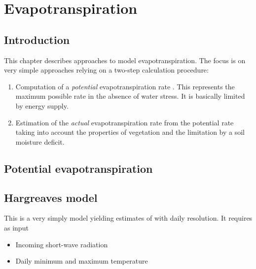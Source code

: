 \chapter{Evapotranspiration} \label{chap:et}
\renewcommand{\tabdir}{chapters/part_processes/evapotranspiration/tab}
\renewcommand{\figdir}{chapters/part_processes/evapotranspiration/fig}

\section{Introduction} \label{sec:et_intro}

This chapter describes approaches to model evapotranspiration. The focus is on very simple approaches relying on a two-step calculation procedure:
\begin{enumerate}
  \item Computation of a \emph{potential} evapotranspiration rate \etPot. This represents the maximum possible rate in the absence of water stress. It is basically limited by energy supply.
  \item Estimation of the \emph{actual} evapotranspiration rate \etReal{} from the potential rate taking into account the properties of vegetation and the limitation by a soil moisture deficit.
\end{enumerate}


\section{Potential evapotranspiration} \label{sec:et:pot}

\section{Hargreaves model} \label{sec:et:pot:hargreaves}

This is a very simply model yielding estimates of \etPot{} with daily resolution. It requires as input
\begin{itemize}
  \item Incoming short-wave radiation
  \item Daily minimum and maximum temperature
\end{itemize}

